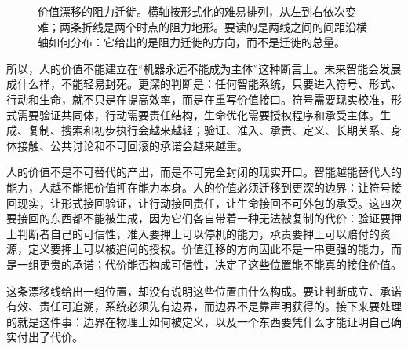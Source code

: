 \begin{figure}[ht]


\caption{价值漂移的阻力迁徙。横轴按形式化的难易排列，从左到右依次变难；两条折线是两个时点的阻力地形。要读的是两线之间的间距沿横轴如何分布：它给出的是阻力迁徙的方向，而不是迁徙的总量。}
\label{fig:value-drift}
\end{figure}


所以，人的价值不能建立在“机器永远不能成为主体”这种断言上。未来智能会发展成什么样，不能轻易封死。更深的判断是：任何智能系统，只要进入符号、形式、行动和生命，就不只是在提高效率，而是在重写价值接口。符号需要现实校准，形式需要验证共同体，行动需要责任结构，生命优化需要授权程序和承受主体。生成、复制、搜索和初步执行会越来越轻；验证、准入、承责、定义、长期关系、身体接触、公共讨论和不可回滚的承诺会越来越重。

人的价值不是不可替代的产出，而是不可完全封闭的现实开口。智能越能替代人的能力，人越不能把价值押在能力本身。人的价值必须迁移到更深的边界：让符号接回现实，让形式接回验证，让行动接回责任，让生命接回不可外包的承受。这四次要接回的东西都不能被生成，因为它们各自带着一种无法被复制的代价：验证要押上判断者自己的可信性，准入要押上可以停机的能力，承责要押上可以赔付的资源，定义要押上可以被追问的授权。价值迁移的方向因此不是一串更强的能力，而是一组更贵的承诺；代价能否构成可信性，决定了这些位置能不能真的接住价值。

这条漂移线给出一组位置，却没有说明这些位置由什么构成。要让判断成立、承诺有效、责任可追溯，系统必须先有边界，而边界不是靠声明获得的。接下来要处理的就是这件事：边界在物理上如何被定义，以及一个东西要凭什么才能证明自己确实付出了代价。
